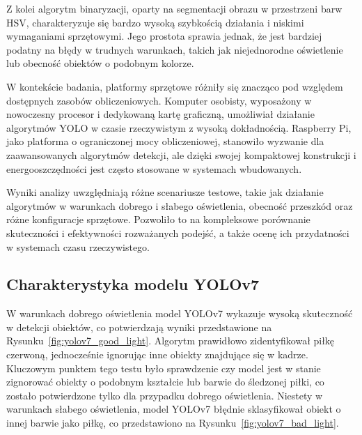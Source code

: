 \documentclass[a4paper,twoside,12pt]{book}
\begin{document}
Z kolei algorytm binaryzacji, oparty na segmentacji obrazu w przestrzeni barw HSV, charakteryzuje się bardzo wysoką szybkością działania i niskimi wymaganiami sprzętowymi. Jego prostota sprawia jednak, że jest bardziej podatny na błędy w trudnych warunkach, takich jak niejednorodne oświetlenie lub obecność obiektów o podobnym kolorze.

W kontekście badania, platformy sprzętowe różniły się znacząco pod względem dostępnych zasobów obliczeniowych. Komputer osobisty, wyposażony w nowoczesny procesor i dedykowaną kartę graficzną, umożliwiał działanie algorytmów YOLO w czasie rzeczywistym z wysoką dokładnością. Raspberry Pi, jako platforma o ograniczonej mocy obliczeniowej, stanowiło wyzwanie dla zaawansowanych algorytmów detekcji, ale dzięki swojej kompaktowej konstrukcji i energooszczędności jest często stosowane w systemach wbudowanych.

Wyniki analizy uwzględniają różne scenariusze testowe, takie jak działanie algorytmów w warunkach dobrego i słabego oświetlenia, obecność przeszkód oraz różne konfiguracje sprzętowe. Pozwoliło to na kompleksowe porównanie skuteczności i efektywności rozważanych podejść, a także ocenę ich przydatności w systemach czasu rzeczywistego.


\newpage

\subsection{Charakterystyka modelu YOLOv7}

W warunkach dobrego oświetlenia model YOLOv7 wykazuje wysoką skuteczność w detekcji obiektów, co potwierdzają wyniki przedstawione na Rysunku~\ref{fig:yolov7_good_light}. Algorytm prawidłowo zidentyfikował piłkę czerwoną, jednocześnie ignorując inne obiekty znajdujące się w kadrze. Kluczowym punktem tego testu było sprawdzenie czy model jest w stanie zignorować obiekty o podobnym kształcie lub barwie do śledzonej piłki, co zostało potwierdzone tylko dla przypadku dobrego oświetlenia. Niestety w warunkach słabego oświetlenia, model YOLOv7 błędnie sklasyfikował obiekt o innej barwie jako piłkę, co przedstawiono na Rysunku~\ref{fig:yolov7_bad_light}.
\end{document}
